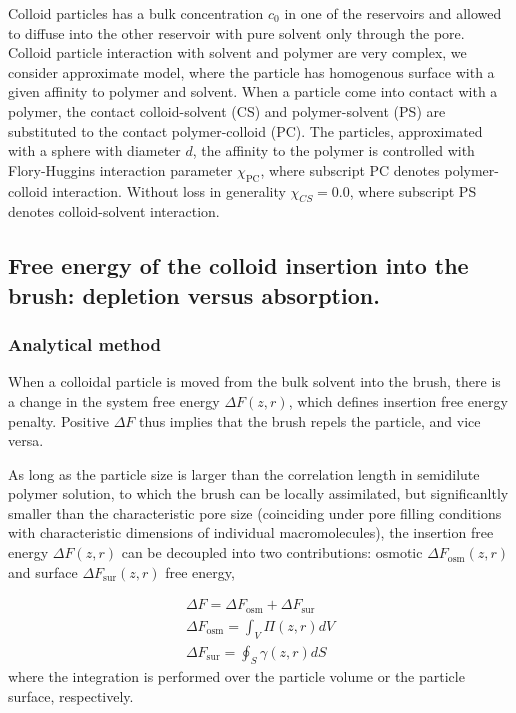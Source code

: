 \documentclass[12pt, a4paper]{article}
\begin{document}
Colloid particles has a bulk concentration $c_0$ in one of the reservoirs and allowed to diffuse into the other reservoir with pure solvent only through the pore.
Colloid particle interaction with solvent and polymer are very complex, we consider approximate model, where the particle has homogenous surface with a given affinity to polymer and solvent.
When a particle come into contact with a polymer, the contact colloid-solvent (CS) and polymer-solvent (PS) are substituted to the contact polymer-colloid (PC).
The particles, approximated with a sphere with diameter $d$, the affinity to the polymer is controlled with Flory-Huggins interaction parameter $\chi_{\textrm{PC}}$, 
where subscript PC denotes polymer-colloid interaction. Without loss in generality $\chi_{CS}=0.0$, where subscript PS denotes colloid-solvent interaction.



\subsection{Free energy of the colloid insertion into the brush: depletion versus absorption.}
\subsubsection*{Analytical method}

When a colloidal particle is moved from the bulk solvent into the brush, there is a change in the system free energy $\Delta F(z,r)$, which defines insertion free energy penalty. 
Positive $\Delta F$ thus implies that the brush repels the particle, and vice versa.

As long as the particle size is larger than the correlation length in semidilute polymer solution, to which the brush can be locally assimilated, but significanltly smaller than the characteristic 
pore size (coinciding under pore filling conditions with characteristic dimensions of individual macromolecules), 
the insertion free energy $\Delta F(z,r)$ can be decoupled into two contributions: osmotic $\Delta F_{\textrm{osm}}(z,r)$ and surface $\Delta F_{\textrm{sur}}(z,r)$ free energy,

\begin{eqnarray}
    \Delta F = \Delta F_{\textrm{osm}} + \Delta F_{\textrm{sur}}
    \\
    \Delta F_{\textrm{osm}} = \int_{V} \Pi(z,r) dV
    \\
    \Delta F_{\textrm{sur}} = \oint_{S} \gamma (z,r) dS
\label{Delta_F}
\end{eqnarray}
where the integration is performed over the particle volume or the particle surface, respectively.
\end{document}
